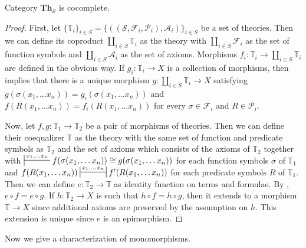 \documentclass[reqno]{amsart}
\theoremstyle{definition}
\theoremstyle{remark}
\newcommand{\cat}[1]{\mathbf{#1}}
\newcommand{\Th}{\cat{Th}}
\numberwithin{figure}{section}
\begin{document}
\begin{prop}[th-cocomplete]
Category $\Th_\mathcal{S}$ is cocomplete.
\end{prop}
\begin{proof}
First, let $\{ \mathbb{T}_i \}_{i \in S} = \{ ((\mathcal{S},\mathcal{F}_i,\mathcal{P}_i),\mathcal{A}_i) \}_{i \in S}$ be a set of theories.
Then we can define its coproduct $\coprod\limits_{i \in S} \mathbb{T}_i$ as the theory with $\coprod\limits_{i \in S} \mathcal{F}_i$ as the set of function symbols and $\coprod\limits_{i \in S} \mathcal{A}_i$ as the set of axioms.
Morphisms $f_i : \mathbb{T}_i \to \coprod\limits_{i \in S} \mathbb{T}_i$ are defined in the obvious way.
If $g_i : \mathbb{T}_i \to X$ is a collection of morphisms, then  implies that there is a unique morphism $g : \coprod\limits_{i \in S} \mathbb{T}_i \to X$
    satisfying $g(\sigma(x_1, \ldots x_n)) = g_i(\sigma(x_1, \ldots x_n))$ and $f(R(x_1, \ldots x_n)) = f_i(R(x_1, \ldots x_n))$
    for every $\sigma \in \mathcal{F}_i$ and $R \in \mathcal{P}_i$.

Now, let $f,g : \mathbb{T}_1 \to \mathbb{T}_2$ be a pair of morphisms of theories.
Then we can define their coequalizer $\mathbb{T}$ as the theory with the same set of function and predicate symbols as $\mathbb{T}_2$ and the set of axioms which consists of the axioms of $\mathbb{T}_2$
together with $\sststile{}{x_1, \ldots x_n} f(\sigma(x_1, \ldots x_n)) \cong g(\sigma(x_1, \ldots x_n))$ for each function symbols $\sigma$ of $\mathbb{T}_1$
and $f(R(x_1, \ldots x_n)) \ssststile{}{x_1, \ldots x_n} f'(R(x_1, \ldots x_n))$ for each predicate symbols $R$ of $\mathbb{T}_1$.
Then we can define $e : \mathbb{T}_2 \to \mathbb{T}$ as identity function on terms and formulae.
By , $e \circ f = e \circ g$.
If $h : \mathbb{T}_2 \to X$ is such that $h \circ f = h \circ g$, then it extends to a morphism $\mathbb{T} \to X$ since additional axioms are preserved by the assumption on $h$.
This extension is unique since $e$ is an epimorphism.
\end{proof}

Now we give a characterization of monomorphisms.
\end{document}
